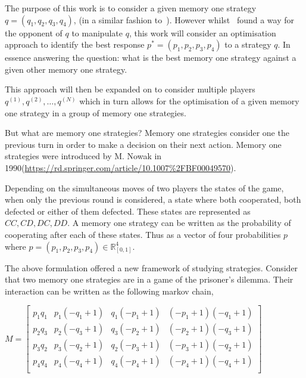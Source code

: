 \documentclass{article}
\begin{document}
The purpose of this work is to consider a given memory one strategy 
\(q=(q_1, q_2, q_3, q_4)\), (in a similar fashion to~\cite{Press2012}). However
whilst~\cite{Press2012} found a way for the opponent of \(q\) to manipulate 
\(q\), this work will consider an optimisation approach to identify the best 
response \(p^*=(p_1, p_2, p_3, p_4)\) to a strategy \(q\). In essence 
answering the question: what is the best memory one strategy against a given 
other memory one strategy.

This approach will then be expanded on to consider multiple players 
\(q^{(1)}, q^{(2)}, \dots ,q^{(N)}\) which in turn allows for the optimisation 
of a given memory one strategy in a group of memory one strategies.

%     

But what are memory one strategies? Memory one strategies consider one the previous
turn in order to make a decision on their next action. Memory one strategies were
introduced by M. Nowak in 1990(\url{https://rd.springer.com/article/10.1007%2FBF00049570}).

\begin{center}
    
\end{center}

Depending on the simultaneous moves of two players the states of the game,
when only the previous round is considered, a state where both cooperated,
both defected or either of them defected. These states are represented as
\(CC, CD, DC, DD\). A memory one strategy can be written as the probability of
cooperating after each of these states. Thus as a vector of four probabilities
\(p\) where \(p = (p_1, p_2, p_3, p_4) \in\mathbb{R}_{[0,1]}^{4}\).


The above formulation offered a new framework of studying strategies. Consider
that two memory one strategies are in a game of the prisoner's dilemma. Their
interaction can be written as the following markov chain,

\(M =
\begin{bmatrix}
    p_{1} q_{1} & p_{1} (- q_{1} + 1) & q_{1} (- p_{1} + 1) & (- p_{1} + 1) (- q_{1} + 1)
    \\
    p_{2} q_{3} & p_{2} (- q_{3} + 1) & q_{3} (- p_{2} + 1) & (- p_{2} + 1) (- q_{3} + 1)
    \\
    p_{3} q_{2} & p_{3} (- q_{2} + 1) & q_{2} (- p_{3} + 1) & (- p_{3} + 1) (- q_{2} + 1)
    \\
    p_{4} q_{4} & p_{4} (- q_{4} + 1) & q_{4} (- p_{4} + 1) & (- p_{4} + 1) (- q_{4} + 1)
    \\
\end{bmatrix}
\)
\end{document}
